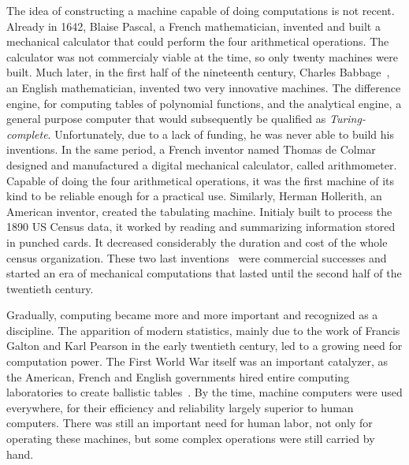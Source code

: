         The idea of constructing a machine capable of doing computations is not recent. Already in 1642, Blaise Pascal,
        a French mathematician, invented and built a mechanical calculator that could perform the four arithmetical
        operations. The calculator was not commercialy viable at the time, so only twenty machines were built. Much
        later, in the first half of the nineteenth century, Charles Babbage~\cite[Chapters~2-3]{human_computers}, an
        English mathematician, invented two very innovative machines. The difference engine, for computing tables of
        polynomial functions, and the analytical engine, a general purpose computer that would subsequently be qualified
        as \emph{Turing-complete}. Unfortunately, due to a lack of funding, he was never able to build his inventions.
        In the same period, a French inventor named Thomas de Colmar designed and manufactured a digital
        mechanical calculator, called arithmometer. Capable of doing the four arithmetical operations, it was the first
        machine of its kind to be reliable enough for a practical use.  Similarly, Herman Hollerith, an American
        inventor, created the tabulating machine. Initialy built to process the 1890 US Census data, it worked by
        reading and summarizing information stored in punched cards. It decreased considerably the duration and cost of
        the whole census organization. These two last inventions~\cite[Chapter~6]{human_computers} were commercial
        successes and started an era of mechanical computations that lasted until the second half of the twentieth
        century.

        Gradually, computing became more and more important and recognized as a discipline. The apparition of modern
        statistics, mainly due to the work of Francis Galton and Karl Pearson in the early twentieth century, led to a
        growing need for computation power. The First World War itself was an important catalyzer, as the American,
        French and English governments hired entire computing laboratories to create ballistic
        tables~\cite[Chapter~10]{human_computers}. By the time, machine computers were used everywhere, for their
        efficiency and reliability largely superior to human computers. There was still an important need for human
        labor, not only for operating these machines, but some complex operations were still carried by hand.


